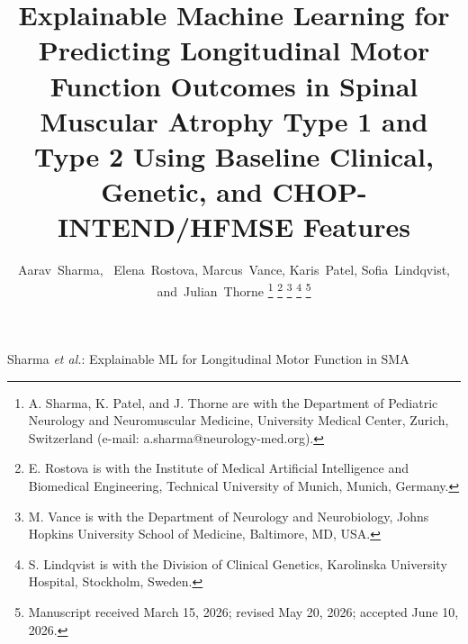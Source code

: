 \documentclass[journal]{IEEEtran}
\begin{document}
\title{Explainable Machine Learning for Predicting Longitudinal Motor Function Outcomes in Spinal Muscular Atrophy Type 1 and Type 2 Using Baseline Clinical, Genetic, and CHOP-INTEND/HFMSE Features}

\author{Aarav~Sharma,~
        Elena~Rostova,
        Marcus~Vance,
        Karis~Patel,
        Sofia~Lindqvist,
        and~Julian~Thorne%
\thanks{A. Sharma, K. Patel, and J. Thorne are with the Department of Pediatric Neurology and Neuromuscular Medicine, University Medical Center, Zurich, Switzerland (e-mail: a.sharma@neurology-med.org).}%
\thanks{E. Rostova is with the Institute of Medical Artificial Intelligence and Biomedical Engineering, Technical University of Munich, Munich, Germany.}%
\thanks{M. Vance is with the Department of Neurology and Neurobiology, Johns Hopkins University School of Medicine, Baltimore, MD, USA.}%
\thanks{S. Lindqvist is with the Division of Clinical Genetics, Karolinska University Hospital, Stockholm, Sweden.}%
\thanks{Manuscript received March 15, 2026; revised May 20, 2026; accepted June 10, 2026.}}

%
{Sharma \MakeLowercase{\textit{et al.}}: Explainable ML for Longitudinal Motor Function in SMA}

\maketitle
\end{document}

